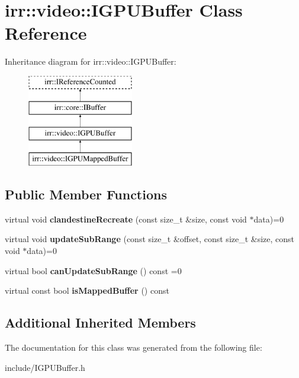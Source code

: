 \hypertarget{classirr_1_1video_1_1IGPUBuffer}{}\section{irr\+:\+:video\+:\+:I\+G\+P\+U\+Buffer Class Reference}
\label{classirr_1_1video_1_1IGPUBuffer}
Inheritance diagram for irr\+:\+:video\+:\+:I\+G\+P\+U\+Buffer\+:\begin{figure}[H]
\begin{center}
\leavevmode
\includegraphics[height=4.000000cm]{classirr_1_1video_1_1IGPUBuffer}
\end{center}
\end{figure}
\subsection*{Public Member Functions}
\begin{DoxyCompactItemize}
\item 
virtual void {\bfseries clandestine\+Recreate} (const size\+\_\+t \&size, const void $\ast$data)=0\hypertarget{classirr_1_1video_1_1IGPUBuffer_a1a6ee6de198bda531f111cbd7c30067c}{}\label{classirr_1_1video_1_1IGPUBuffer_a1a6ee6de198bda531f111cbd7c30067c}

\item 
virtual void {\bfseries update\+Sub\+Range} (const size\+\_\+t \&offset, const size\+\_\+t \&size, const void $\ast$data)=0\hypertarget{classirr_1_1video_1_1IGPUBuffer_a956acd88e159028175ec33c7bdc7be36}{}\label{classirr_1_1video_1_1IGPUBuffer_a956acd88e159028175ec33c7bdc7be36}

\item 
virtual bool {\bfseries can\+Update\+Sub\+Range} () const  =0\hypertarget{classirr_1_1video_1_1IGPUBuffer_af74c5f66d2538fb8d966ec2762f0a64e}{}\label{classirr_1_1video_1_1IGPUBuffer_af74c5f66d2538fb8d966ec2762f0a64e}

\item 
virtual const bool {\bfseries is\+Mapped\+Buffer} () const \hypertarget{classirr_1_1video_1_1IGPUBuffer_a7e812765c75d4a6c0259e2aa8a2093b3}{}\label{classirr_1_1video_1_1IGPUBuffer_a7e812765c75d4a6c0259e2aa8a2093b3}

\end{DoxyCompactItemize}
\subsection*{Additional Inherited Members}


The documentation for this class was generated from the following file\+:\begin{DoxyCompactItemize}
\item 
include/I\+G\+P\+U\+Buffer.\+h\end{DoxyCompactItemize}
